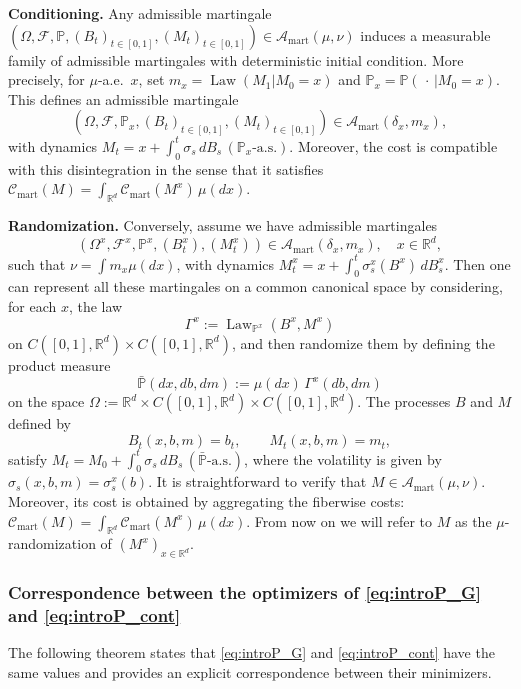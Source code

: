 \documentclass[reqno, a4paper]{amsart}
\theoremstyle{plain}
\theoremstyle{definition}
\theoremstyle{remark}
\numberwithin{equation}{section}
\numberwithin{theorem}{section}
\newcommand{\R}{\mathbb{R}}
\newcommand{\Law}{\operatorname{Law}}
\begin{document}
	\textbf{Conditioning.}  
	Any admissible martingale
	$
	\left(\Omega,\mathcal F,\mathbb P,(B_t)_{t \in [0,1]},(M_t)_{t \in [0,1]}\right) \in \mathcal A_{\mathrm{mart}}(\mu,\nu)
	$ 
	induces a measurable family of admissible martingales with deterministic initial condition. More precisely, for $\mu$-a.e.\ $x$, set $m_x = \Law(M_1|M_0 = x)$ and $\mathbb P_x=\mathbb P(\,\cdot\,|M_0=x)$.
	This defines an admissible martingale
	\[
	\left(\Omega,\mathcal F,\mathbb P_x,(B_t)_{t \in [0,1]},(M_t)_{t \in [0,1]}\right)\in \mathcal A_{\mathrm{mart}}(\delta_x,m_x),
	\]
	with dynamics
	$
	M_t = x + \int_0^t \sigma_s\,dB_s
	\, (\mathbb P_x\text{-a.s.})
	$. 
	Moreover, the cost is compatible with this disintegration in the sense that it satisfies
	$
	\mathcal C_{\mathrm{mart}}(M)
	=
	\int_{\R^d} \mathcal C_{\mathrm{mart}}(M^x)\,\mu(dx)
	$.
	
	\textbf{Randomization.}  
	Conversely, assume we have admissible martingales
	\[
	\left(\Omega^x,\mathcal F^x,\mathbb P^x,(B_t^x),(M_t^x)\right)
	\in \mathcal A_{\mathrm{mart}}(\delta_x,m_x), \quad x \in \R^d,
	\]
	such that $\nu = \int m_x \mu(dx)$, with dynamics
	$
	M_t^x = x + \int_0^t \sigma_s^x(B^x)\,dB_s^x
	$. 
	Then one can represent all these martingales on a common canonical space by considering, for each $x$, the law
	\[
	\Gamma^x:=\Law_{\mathbb P^x}(B^x,M^x)
	\]
	on $C([0,1],\R^d)\times C([0,1],\R^d)$, and then randomize them by defining the product measure
	\[
	\bar{\mathbb P}(dx,db,dm):=\mu(dx)\,\Gamma^x(db,dm)
	\]
	on the space $ \Omega := \R^d \times C([0,1],\R^d)\times C([0,1],\R^d)$. The processes $B$ and $M$ defined by
	\[
	B_t(x,b,m)=b_t,\qquad M_t(x,b,m)=m_t,
	\]
	satisfy
	$	M_t = M_0 + \int_0^t \sigma_s\,dB_s
	\, ( \bar{\mathbb P}\text{-a.s.})
	$,	
	where the volatility is given by
	$\sigma_s(x,b,m) = \sigma_s^{x}(b)$. It is straightforward to verify that $M \in \mathcal A_{\mathrm{mart}}(\mu,\nu)$. Moreover, its cost is obtained by aggregating the fiberwise costs:
	$
	\mathcal C_{\mathrm{mart}}(M)
	=
	\int_{\R^d} \mathcal C_{\mathrm{mart}}(M^x)\,\mu(dx)
	$. 
	From now on we will refer to $M$ as the $\mu$-randomization of $(M^x)_{x \in \R^d}.$
	
	
	\subsubsection{Correspondence between the optimizers of \eqref{eq:introP_G} and \eqref{eq:introP_cont} }
	
	
	The following theorem states that \eqref{eq:introP_G} and \eqref{eq:introP_cont} have the same values and provides an explicit correspondence between their minimizers.
	
\end{document}
